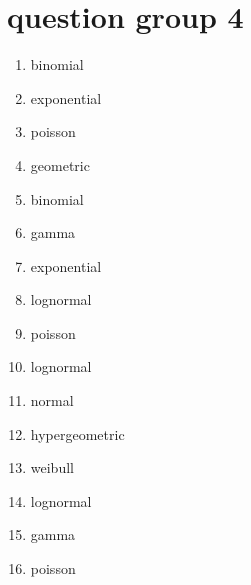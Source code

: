 \documentclass{article}
\begin{document}
\section*{question group 4}
\begin{enumerate}
\item binomial \\
\item exponential \\
\item poisson \\
\item geometric \\
\item binomial \\
\item gamma \\
\item exponential \\
\item lognormal \\
\item poisson \\
\item lognormal \\
\item normal \\
\item hypergeometric \\
\item weibull \\
\item lognormal \\
\item gamma \\
\item poisson
\end{enumerate}
\end{document}
